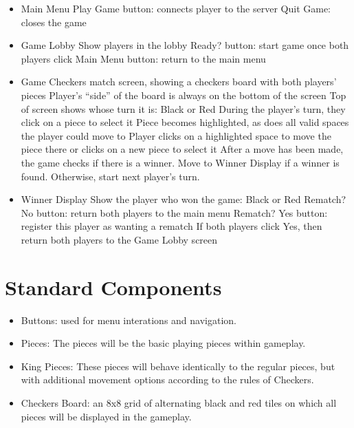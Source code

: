 \documentclass[10pt]{article}
\begin{document}
\begin{itemize}
\item Main Menu
    \subitem Play Game button: connects player to the server
    \subitem Quit Game: closes the game

\item Game Lobby
    \subitem Show players in the lobby
    \subitem Ready? button: start game once both players click
    \subitem Main Menu button: return to the main menu

\item Game
    \subitem Checkers match screen, showing a checkers board with both players’ pieces
        \subsubitem Player’s “side” of the board is always on the bottom of the screen
    \subitem Top of screen shows whose turn it is: Black or Red
        \subsubitem During the player’s turn, they click on a piece to select it
        \subsubitem Piece becomes highlighted, as does all valid spaces the player could move to
        \subsubitem Player clicks on a highlighted space to move the piece there or clicks on a new piece to select it
        \subsubitem After a move has been made, the game checks if there is a winner. Move to Winner Display if a winner is found. Otherwise, start next player’s turn.

\item Winner Display
    \subitem Show the player who won the game: Black or Red
    \subitem Rematch? No button: return both players to the main menu
    \subitem Rematch? Yes button: register this player as wanting a rematch
        \subsubitem If both players click Yes, then return both players to the Game Lobby screen
\end{itemize}

\section{Standard Components}

\begin{itemize}
    \item Buttons: used for menu interations and navigation.
    \item Pieces: The pieces will be the basic playing pieces within gameplay.
    \item King Pieces: These pieces will behave identically to the regular pieces, but with additional movement options according to the rules of Checkers.
    \item Checkers Board: an 8x8 grid of alternating black and red tiles on which all pieces will be displayed in the gameplay.
\end{itemize}
\end{document}
